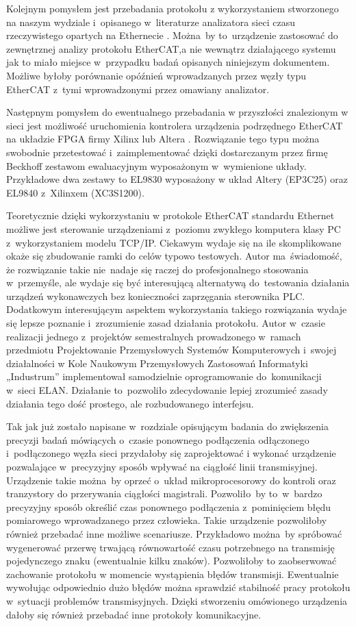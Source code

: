 Kolejnym pomysłem jest przebadania protokołu z wykorzystaniem stworzonego na naszym wydziale i~opisanego w~literaturze analizatora sieci czasu rzeczywistego opartych na Ethernecie \cite{projekt_FPGA}. Można~by to~urządzenie zastosować do zewnętrznej analizy protokołu EtherCAT,a nie wewnątrz działającego systemu jak to miało miejsce w~przypadku badań opisanych niniejszym dokumentem. Możliwe byłoby porównanie opóźnień wprowadzanych przez węzły typu EtherCAT z~tymi wprowadzonymi przez omawiany analizator.

Następnym pomysłem do ewentualnego przebadania w przyszłości znalezionym w sieci jest możliwość uruchomienia kontrolera urządzenia podrzędnego EtherCAT na układzie FPGA firmy Xilinx lub Altera \cite{FPGA_Xilinx, FPGA_Altera}. Rozwiązanie tego typu można swobodnie przetestować i~zaimplementować dzięki dostarczanym przez firmę Beckhoff zestawom ewaluacyjnym wyposażonym w~wymienione układy. Przykładowe dwa zestawy to EL9830 wyposażony w układ Altery (EP3C25) oraz EL9840 z~Xilinxem (XC3S1200).


Teoretycznie dzięki wykorzystaniu w protokole EtherCAT standardu Ethernet możliwe jest sterowanie urządzeniami z~poziomu zwykłego komputera klasy PC z~wykorzystaniem modelu TCP/IP. Ciekawym wydaje się na ile skomplikowane okaże się zbudowanie ramki do celów typowo testowych. Autor ma~świadomość, że rozwiązanie takie nie~nadaje się raczej do profesjonalnego stosowania w~przemyśle, ale wydaje się być interesującą alternatywą do~testowania działania urządzeń wykonawczych bez konieczności zaprzęgania sterownika PLC. Dodatkowym interesującym aspektem wykorzystania takiego rozwiązania wydaje się lepsze poznanie i~zrozumienie zasad działania protokołu. Autor w~czasie realizacji jednego z~projektów semestralnych prowadzonego w~ramach przedmiotu Projektowanie Przemysłowych Systemów Komputerowych i~swojej działalności w Kole Naukowym Przemysłowych Zastosowań Informatyki „Industrum” implementował samodzielnie oprogramowanie do~komunikacji w~sieci ELAN. Działanie to~pozwoliło zdecydowanie lepiej zrozumieć zasady działania tego dość prostego, ale rozbudowanego interfejsu.

Tak jak już zostało napisane w~rozdziale opisującym badania do zwiększenia precyzji badań mówiących o~czasie ponownego podłączenia odłączonego i~podłączonego węzła sieci przydałoby się zaprojektować i wykonać urządzenie pozwalające w~precyzyjny sposób wpływać na ciągłość linii transmisyjnej. Urządzenie takie można~by oprzeć o~układ mikroprocesorowy do kontroli oraz tranzystory do przerywania ciągłości magistrali. Pozwoliło~by to~w~bardzo precyzyjny sposób określić czas ponownego podłączenia z~pominięciem błędu pomiarowego wprowadzanego przez człowieka. Takie urządzenie pozwoliłoby również przebadać inne możliwe scenariusze. Przykładowo można~by spróbować wygenerować przerwę trwającą równowartość czasu potrzebnego na transmisję pojedynczego znaku (ewentualnie kilku znaków). Pozwoliłoby to zaobserwować zachowanie protokołu w momencie wystąpienia błędów transmisji. Ewentualnie wywołując odpowiednio dużo błędów można sprawdzić stabilność pracy protokołu w~sytuacji problemów transmisyjnych.
Dzięki stworzeniu omówionego urządzenia dałoby się również przebadać inne protokoły komunikacyjne.
